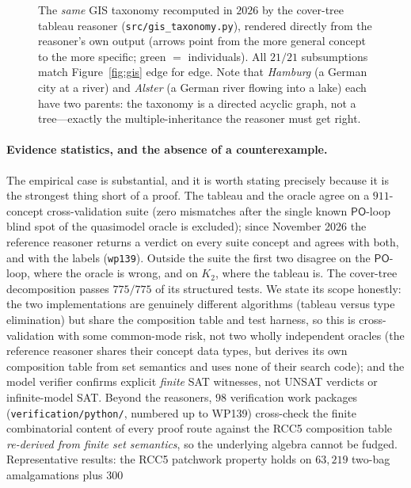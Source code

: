 \documentclass[11pt]{article}
\newcommand{\PO}{\mathsf{PO}}
\theoremstyle{plain}
\theoremstyle{definition}
\begin{document}
\begin{figure}[p]
{%
}
\caption{The \emph{same} GIS taxonomy recomputed in $2026$ by the
cover-tree tableau reasoner (\texttt{src/gis\_taxonomy.py}), rendered
directly from the reasoner's own output (arrows point from the more
general concept to the more specific; green $=$ individuals). All $21/21$
subsumptions match Figure~\ref{fig:gis} edge for edge. Note that
\emph{Hamburg} (a German city at a river) and \emph{Alster} (a German
river flowing into a lake) each have two parents: the taxonomy is a
directed acyclic graph, not a tree---exactly the multiple-inheritance the
reasoner must get right.}
\label{fig:gis-reasoner}
\end{figure}

\paragraph{Evidence statistics, and the absence of a counterexample.} The
empirical case is substantial, and it is worth stating precisely because
it is the strongest thing short of a proof. The tableau and the oracle agree
on a $911$-concept cross-validation suite (zero mismatches after the single
known $\PO$-loop blind spot of the quasimodel oracle is excluded); since
November 2026 the reference reasoner returns a verdict on every suite concept
and agrees with both, and with the labels (\texttt{wp139}). Outside the suite
the first two disagree on the $\PO$-loop, where the oracle is wrong, and on
$K_2$, where the tableau is. The
cover-tree decomposition passes $775/775$ of its structured tests. We state
its scope honestly: the two implementations are genuinely different
algorithms (tableau versus type elimination) but share the composition
table and test harness, so this is cross-validation with some common-mode
risk, not two wholly independent oracles (the reference reasoner shares their
concept data types, but derives its own composition table from set semantics
and uses none of their search code); and the model verifier confirms
explicit \emph{finite} SAT witnesses, not UNSAT verdicts or infinite-model
SAT. Beyond
the reasoners, $98$ verification work packages
(\texttt{verification/python/}, numbered up to WP139) cross-check the finite
combinatorial content of every proof route against the RCC5 composition
table \emph{re-derived from finite set semantics}, so the underlying
algebra cannot be fudged. Representative results: the RCC5 patchwork
property holds on $63{,}219$ two-bag amalgamations plus $300$
\end{document}
